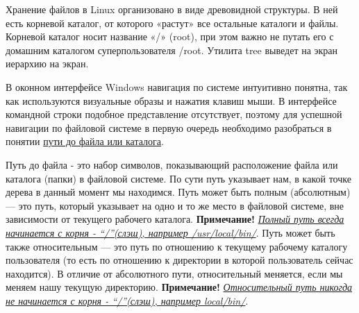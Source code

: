 \documentclass[14pt, a4paper]{article}
\begin{document}
Хранение файлов в Linux организовано в виде древовидной структуры. В ней есть корневой
каталог, от которого «растут» все остальные каталоги и файлы. Корневой каталог носит название «/»
(root), при этом важно не путать его с домашним каталогом суперпользователя /root. Утилита \colorbox{backcolour}{tree}
выведет на экран иерархию на экран.

\begin{figure}[h]%
    \centering
    \label{1.0}
\end{figure}

В оконном интерфейсе Windows навигация по системе интуитивно понятна, так как
используются визуальные образы и нажатия клавиш мыши. В интерфейсе командной строки
подобное представление отсутствует, поэтому для успешной навигации по файловой системе в
первую очередь необходимо разобраться в понятии \href{https://ru.wikipedia.org/wiki/%D0%9F%D1%83%D1%82%D1%8C_%D0%BA_%D1%84%D0%B0%D0%B9%D0%BB%D1%83}{пути до файла или каталога}.

Путь до файла - это набор символов, показывающий расположение файла или каталога
(папки) в файловой системе. По сути путь указывает нам, в какой точке дерева в данный момент
мы находимся. Путь может быть полным (абсолютным) — это путь, который указывает на одно и то
же место в файловой системе, вне зависимости от текущего рабочего каталога. \textbf{Примечание!} \textit{\uline{Полный
путь всегда начинается с корня - “/”(слэш), например /usr/local/bin/}}. Путь может быть также
относительным — это путь по отношению к текущему рабочему каталогу пользователя (то есть по
отношению к директории в которой пользователь сейчас находится). В отличие от абсолютного пути,
относительный меняется, если мы меняем нашу текущую директорию. \textbf{Примечание!}
\textit{\uline{Относительный путь никогда не начинается с корня - “/”(слэш), например local/bin/}}.
\end{document}
